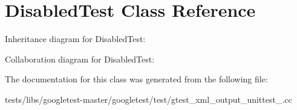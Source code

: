 \hypertarget{classDisabledTest}{}\section{Disabled\+Test Class Reference}
\label{classDisabledTest}


Inheritance diagram for Disabled\+Test\+:


Collaboration diagram for Disabled\+Test\+:


The documentation for this class was generated from the following file\+:\begin{DoxyCompactItemize}
\item 
tests/libs/googletest-\/master/googletest/test/gtest\+\_\+xml\+\_\+output\+\_\+unittest\+\_\+.\+cc\end{DoxyCompactItemize}
